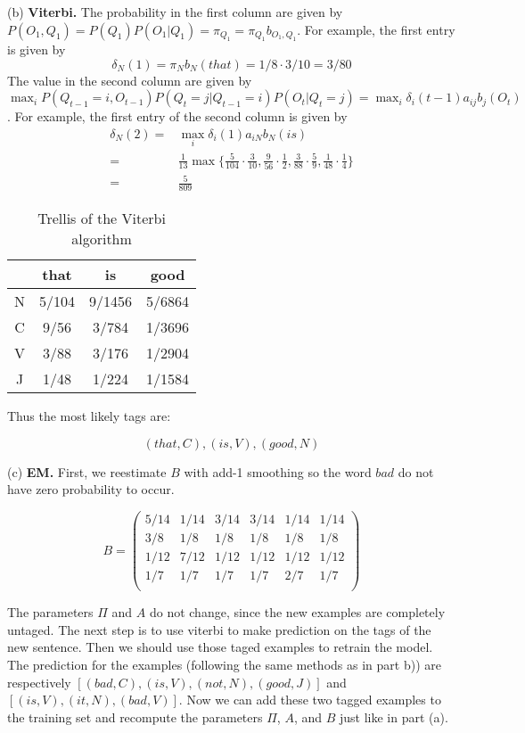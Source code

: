 \documentclass[10pt]{article}
\begin{document}
(b) \textbf{Viterbi.} The probability in the first column are given by $P(O_1, Q_1)=P(Q_1)P(O_1|Q_1)=\pi_{Q_1}=\pi_{Q_1}b_{O_1, Q_1}$. For example, the first entry is given by
\[
	\delta_N(1) = \pi_N b_{N}(that) = 1/8 \cdot 3/10 = 3/80
\]
The value in the second column are given by $\max_i P(Q_{t-1}=i, O_{t-1}) P(Q_t=j|Q_{t-1}=i)P(O_t|Q_t=j)=\max_i\delta_i(t-1)a_{ij}b_j(O_t)$. For example, the first entry of the second column is given by
\begin{equation}
	\begin{split}
		\delta_N(2) 
			=& \max_i \delta_i(1)a_{iN}b_N(is) \\
			=& \frac{1}{13}\max \{
				\frac{5}{104}\cdot \frac{3}{10},
				\frac{9}{56}\cdot \frac{1}{2},
				\frac{3}{88}\cdot \frac{5}{9},
				\frac{1}{48}\cdot \frac{1}{4}
			\}\\
			=& \frac{5}{809}
	\end{split}
\end{equation}
\begin{table}[h!]
	\centering
	\begin{tabular}{ c|c|c|c| }
		& that & is & good  \\
		\hline
		N & 5/104 & 9/1456 & 5/6864 \\
		\hline
		C & 9/56 & 3/784 & 1/3696 \\
		\hline
		V & 3/88 & 3/176 & 1/2904 \\
		\hline
		J & 1/48 & 1/224 & 1/1584 \\
		\hline
	\end{tabular}
	\caption{Trellis of the Viterbi algorithm}
	\label{table:result}
\end{table}

Thus the most likely tags are:

\[
	(that, C), (is, V), (good, N)
\]

(c) \textbf{EM.} First, we reestimate $B$ with add-1 smoothing so the word $bad$ do not have zero probability to occur.

\[
	B = 
	\begin{pmatrix}
		5/14 & 1/14 & 3/14 & 3/14 & 1/14 & 1/14\\
		3/8 & 1/8 & 1/8 & 1/8 & 1/8 & 1/8 \\
		1/12 & 7/12 & 1/12 & 1/12 & 1/12 & 1/12\\
		1/7 & 1/7 & 1/7 & 1/7 & 2/7 & 1/7 \\
	\end{pmatrix}
\]

The parameters $\Pi$ and $A$ do not change, since the new examples are completely untaged. The next step is to use viterbi to make prediction on the tags of the new sentence. Then we should use those taged examples to retrain the model.\\

The prediction for the examples (following the same methods as in part b)) are respectively $[(bad, C),  (is, V), (not, N), (good, J)]$ and $[(is, V), (it, N), (bad, V)]$. Now we can add these two tagged examples to the training set and recompute the parameters $\Pi$, $A$, and $B$ just like in part (a).
\end{document}
